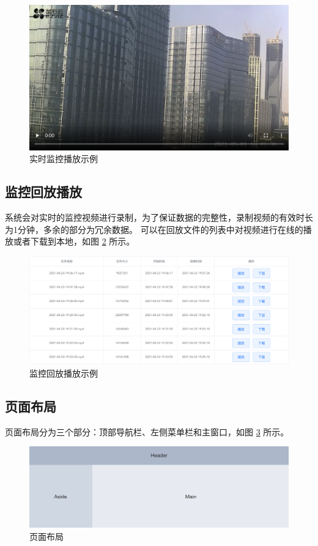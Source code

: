 \begin{figure}[ht]
    \centering
    \includegraphics[width=1\linewidth]{./Figure/IMG_record_eg.png}
    \caption{实时监控播放示例}\label{Fig:record_eg}
\end{figure}

\subsection{监控回放播放}
系统会对实时的监控视频进行录制，为了保证数据的完整性，录制视频的有效时长为1分钟，多余的部分为冗余数据。
可以在回放文件的列表中对视频进行在线的播放或者下载到本地，如图 \ref{Fig:file_list} 所示。

\begin{figure}[ht]
    \centering
    \includegraphics[width=1\linewidth]{./Figure/IMG_file_list.png}
    \caption{监控回放播放示例}\label{Fig:file_list}
\end{figure}

\newpage
\subsection{页面布局}
页面布局分为三个部分：顶部导航栏、左侧菜单栏和主窗口，如图 \ref{Fig:layout} 所示。

\begin{figure}[ht]
    \centering
    \includegraphics[width=1\linewidth]{./Figure/IMG_layout.png}
    \caption{页面布局}\label{Fig:layout}
\end{figure}

